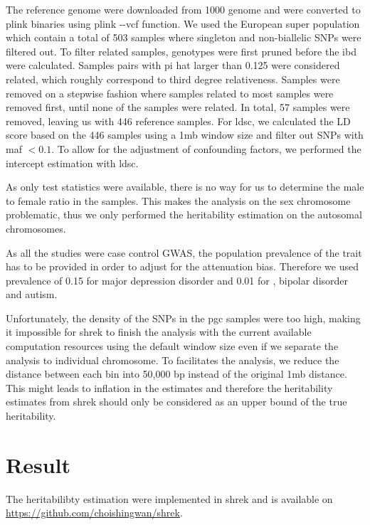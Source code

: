 	The reference genome were downloaded from 1000 genome \citep{Project2012} and were converted to plink binaries using plink -{}-vcf function. 
	We used the European super population which contain a total of 503 samples where singleton and non-biallelic \glspl{SNP} were filtered out.
	To filter related samples, genotypes were first pruned before the \gls{ibd} were calculated.
	Samples pairs with pi hat larger than 0.125 were considered related, which roughly correspond to third degree relativeness. 
	Samples were removed on a stepwise fashion where samples related to most samples were removed first, until none of the samples were related. 
	In total, 57 samples were removed, leaving us with 446 reference samples. 
	For \gls{ldsc}, we calculated the \gls{LD} score based on the 446 samples using a 1\gls{mb} window size and filter out \glspl{SNP} with \gls{maf} $<0.1$.
	To allow for the adjustment of confounding factors, we performed the intercept estimation with \gls{ldsc}.
	
	As only test statistics were available, there is no way for us to determine the male to female ratio in the samples. 
	This makes the analysis on the sex chromosome problematic, thus we only performed the heritability estimation on the autosomal chromosomes.
	
	As all the studies were case control \gls{GWAS}, the population prevalence of the trait has to be provided in order to adjust for the attenuation bias. 
	Therefore we used prevalence of 0.15 for major depression disorder and 0.01 for , bipolar disorder and autism.

	Unfortunately, the density of the \glspl{SNP} in the \gls{pgc}  samples were too high, making it  impossible for \gls{shrek} to finish the analysis with the current available computation resources using the default window size even if we separate the analysis to individual chromosome.
	To facilitates the analysis, we reduce the distance between each bin into 50,000 bp instead of the original 1\gls{mb} distance. 
	This might leads to inflation in the estimates and therefore the heritability estimates from \gls{shrek} should only be considered as an upper bound of the true heritability.
	
	
	\section{Result}
		The heritabilibty estimation were implemented in \gls{shrek} and is available on \url{https://github.com/choishingwan/shrek}.  

